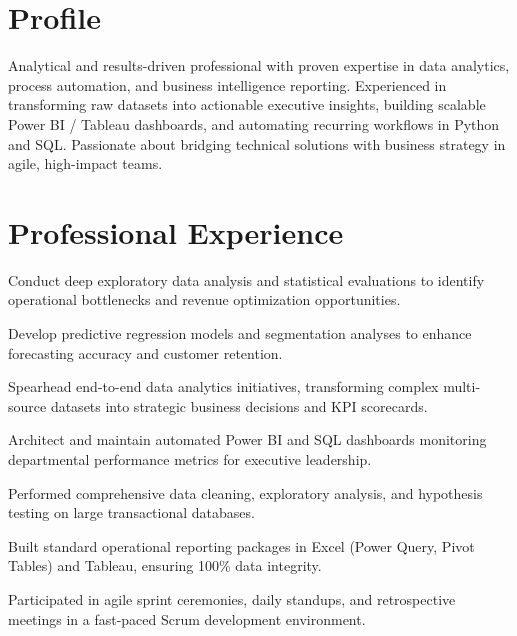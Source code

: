 \documentclass[10pt,a4paper]{article}
\begin{document}

\section*{Profile}
Analytical and results-driven professional with proven expertise in data analytics, process automation, and business intelligence reporting. Experienced in transforming raw datasets into actionable executive insights, building scalable Power BI / Tableau dashboards, and automating recurring workflows in Python and SQL. Passionate about bridging technical solutions with business strategy in agile, high-impact teams.

\section*{Professional Experience}

\begin{cvitems}

  \item Conduct deep exploratory data analysis and statistical evaluations to identify operational bottlenecks and revenue optimization opportunities.

  \item Develop predictive regression models and segmentation analyses to enhance forecasting accuracy and customer retention.

  \item Spearhead end-to-end data analytics initiatives, transforming complex multi-source datasets into strategic business decisions and KPI scorecards.

  \item Architect and maintain automated Power BI and SQL dashboards monitoring departmental performance metrics for executive leadership.

\end{cvitems}
\vspace{2pt}

\begin{cvitems}

  \item Performed comprehensive data cleaning, exploratory analysis, and hypothesis testing on large transactional databases.

  \item Built standard operational reporting packages in Excel (Power Query, Pivot Tables) and Tableau, ensuring 100\% data integrity.

  \item Participated in agile sprint ceremonies, daily standups, and retrospective meetings in a fast-paced Scrum development environment.

\end{cvitems}
\vspace{2pt}
\end{document}
